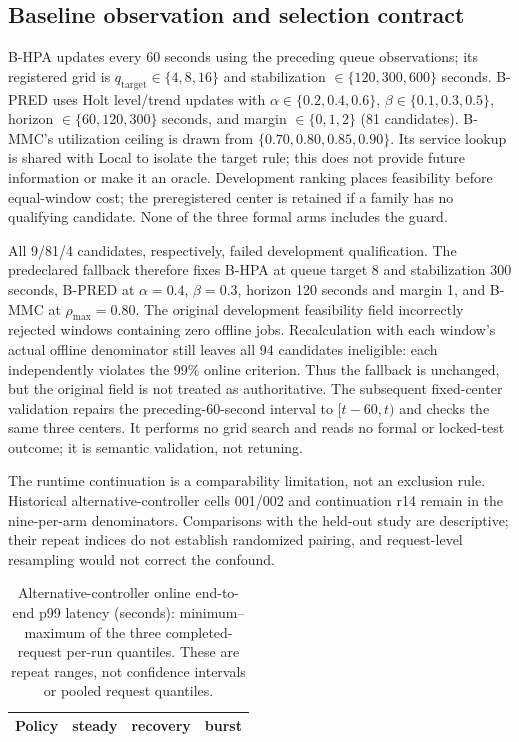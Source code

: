\subsection{Baseline observation and selection contract}
\label{app:baselinecontract}
B-HPA updates every 60 seconds using the preceding queue observations; its
registered grid is $q_{\mathrm{target}}\in\{4,8,16\}$ and stabilization
$\in\{120,300,600\}$ seconds. B-PRED uses Holt level/trend updates with
$\alpha\in\{0.2,0.4,0.6\}$, $\beta\in\{0.1,0.3,0.5\}$, horizon
$\in\{60,120,300\}$ seconds, and margin $\in\{0,1,2\}$ (81 candidates).
B-MMC's utilization ceiling is drawn from $\{0.70,0.80,0.85,0.90\}$. Its
service lookup is shared with Local to isolate the target rule; this does not provide
future information or make it an oracle. Development ranking places feasibility
before equal-window cost; the preregistered center is retained if a family has
no qualifying candidate. None of the three formal arms includes the guard.

All 9/81/4 candidates, respectively, failed development qualification. The
predeclared fallback therefore fixes B-HPA at queue target 8 and stabilization
300 seconds, B-PRED at $\alpha=0.4$, $\beta=0.3$, horizon 120 seconds and
margin 1, and B-MMC at $\rho_{\max}=0.80$. The original development feasibility
field incorrectly rejected windows containing zero offline jobs. Recalculation
with each window's actual offline denominator still leaves all 94 candidates
ineligible: each independently violates the 99\% online criterion. Thus the
fallback is unchanged, but the original field is not treated as authoritative.
The subsequent fixed-center validation repairs the preceding-60-second interval
to $[t-60,t)$ and checks the same three centers. It performs no grid search and
reads no formal or locked-test outcome; it is semantic validation, not retuning.

The runtime continuation is a comparability limitation, not an exclusion rule.
Historical alternative-controller cells 001/002 and continuation r14 remain in the nine-per-arm
denominators. Comparisons with the held-out study are descriptive; their repeat indices
do not establish randomized pairing, and request-level resampling would not
correct the confound.

\begin{table}[t]
\centering
\small
\caption{Alternative-controller online end-to-end p99 latency (seconds): minimum--maximum
of the three completed-request per-run quantiles. These are repeat ranges, not
confidence intervals or pooled request quantiles.}
\label{tab:w1latency}
\setlength{\tabcolsep}{3pt}
\par\vspace{4pt}
\begin{tabular*}{\linewidth}{@{\extracolsep{\fill}}lrrr@{}}
\toprule
Policy & steady & recovery & burst\\
\midrule

\end{tabular*}
\end{table}

